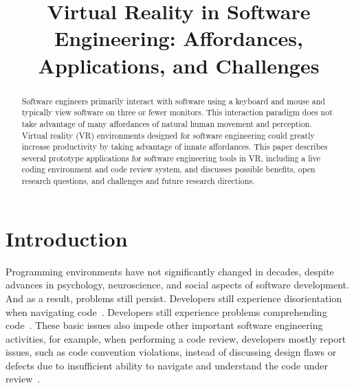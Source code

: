 \documentclass[conference]{IEEEtran}
\begin{document}
\title{Virtual Reality in Software Engineering: Affordances, Applications, and Challenges}

\author{
\and
{}
\and
{}
}

\maketitle
\begin{abstract}
Software engineers primarily interact with software using a keyboard and mouse and typically view software on three or fewer monitors.
This interaction paradigm does not take advantage of many affordances of natural human movement and perception.
Virtual reality (VR) environments designed for software engineering could greatly increase productivity by taking advantage of innate affordances.
This paper describes several prototype applications for software engineering tools in VR, including a live coding environment and code review system, and discusses possible benefits, open research questions, and challenges and future research directions.
\end{abstract}

\section{Introduction}

Programming environments have not significantly changed in decades, 
despite advances in psychology, neuroscience, and social aspects of software development.
And as a result, problems still persist.  Developers still experience disorientation when navigating code~\cite{PatchWorks?}.
Developers still experience problems comprehending code~\cite{Tobias}.  These basic issues also impede other important software engineering activities, for example,
when performing a code review, developers mostly report issues, such as code convention violations, instead of discussing design flaws or defects
due to insufficient ability to navigate and understand the code under review~\cite{bacchelli:ModernCodeReviewChallenges}.  
\end{document}
